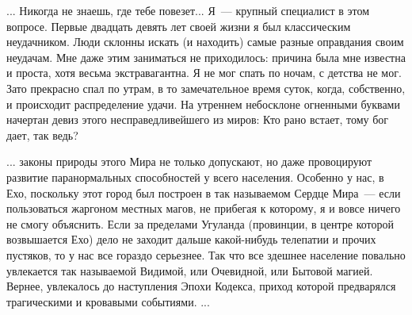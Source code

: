 \documentclass{article}
\begin{document}
\sloppy

... Никогда не знаешь, где тебе повезет... Я~--- крупный специалист в
этом вопросе. Первые двадцать девять лет своей жизни я был классическим
неудачником. Люди склонны искать (и находить) самые разные оправдания
своим неудачам. Мне даже этим заниматься не приходилось: причина была мне
известна и проста, хотя весьма экстравагантна. Я не мог спать по ночам, с
детства не мог. Зато прекрасно спал по утрам, в то замечательное время
суток, когда, собственно, и происходит распределение удачи. На утреннем
небосклоне огненными буквами начертан девиз этого несправедливейшего из
миров: \<Кто рано встает, тому бог дает\>, так ведь?

... законы природы этого Мира не только допускают, но даже провоцируют
развитие \<паранормальных\> способностей у всего населения. Особенно у нас,
в Ехо, поскольку этот город был построен в так называемом \<Сердце Мира\>~---
если пользоваться жаргоном местных магов, не прибегая к которому, я и
вовсе ничего не смогу объяснить. Если за пределами Угуланда (провинции, в
центре которой возвышается Ехо) дело не заходит дальше какой-нибудь
телепатии и прочих пустяков, то у нас все гораздо серьезнее. Так что все
здешнее население повально увлекается так называемой \<Видимой\>, или
\<Очевидной\>, или \<Бытовой\> магией. Вернее, увлекалось до наступления
Эпохи Кодекса, приход которой предварялся трагическими и кровавыми
событиями. ...
\end{document}
